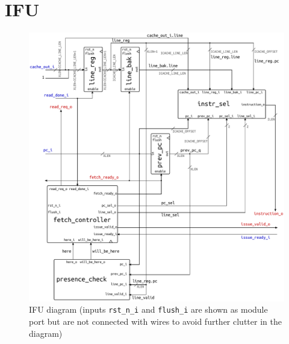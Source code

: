 \section{\acf{IFU}}\label{sec:ifu}
\begin{figure}[hbt]
  \centering
  \includegraphics[width=\textwidth]{img/ifu.pdf}
  \caption[\acs{IFU} diagram]{\acs{IFU} diagram (inputs \texttt{rst\_n\_i} and \texttt{flush\_i} are shown as module port but are not connected with wires to avoid further clutter in the diagram)}
  \label{fig:ifu}
\end{figure}
